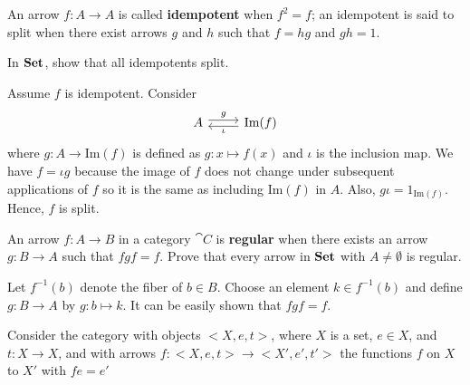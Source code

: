 \documentclass[11pt,a4paper]{article}
\begin{document}
\begin{exercise}
    An arrow $f:A\to A$ is called \textbf{idempotent} when $f^2=f$; an idempotent is said to split when there exist arrows $g$ and $h$ such that $f=hg$ and $gh=1$.\par
    In $\mathbf{Set}$, show that all idempotents split.
\end{exercise}
\begin{solution}
    Assume $f$ is idempotent. Consider
    \begin{equation*}
    \begin{tikzcd}
        A \arrow[r, shift left, sloped, "g"] & \text{Im}(f) \arrow[l, shift left, sloped, "\iota"']
    \end{tikzcd}
    \end{equation*}
    where $g:A\to\text{Im}(f)$ is defined as $g: x\mapsto f(x)$ and $\iota$ is the inclusion map. We have $f=\iota g$ because the image of $f$ does not change under subsequent applications of $f$ so it is the same as including $\text{Im}(f)$ in $A$. Also, $g\iota=1_{\text{Im}(f)}$. Hence, $f$ is split.
\end{solution}

\begin{exercise}
    An arrow $f:A\to B$ in a category $\cat{C}$ is \textbf{regular} when there exists an arrow $g:B\to A$ such that $fgf=f$. Prove that every arrow in $\mathbf{Set}$ with $A\neq\emptyset$ is regular.
\end{exercise}
\begin{solution}
    Let $f^{-1}(b)$ denote the fiber of $b\in B$. Choose an element $k\in f^{-1}(b)$ and define $g: B\to A$ by $g: b\mapsto k$. It can be easily shown that $fgf=f$.
\end{solution}

\begin{exercise}
    Consider the category with objects $<X,e,t>$, where $X$ is a set, $e\in X$, and $t:X\to X$, and with arrows $f:<X,e,t>\to <X',e',t'>$ the functions $f$ on $X$ to $X'$ with $fe=e'$
\end{exercise}
\end{document}
